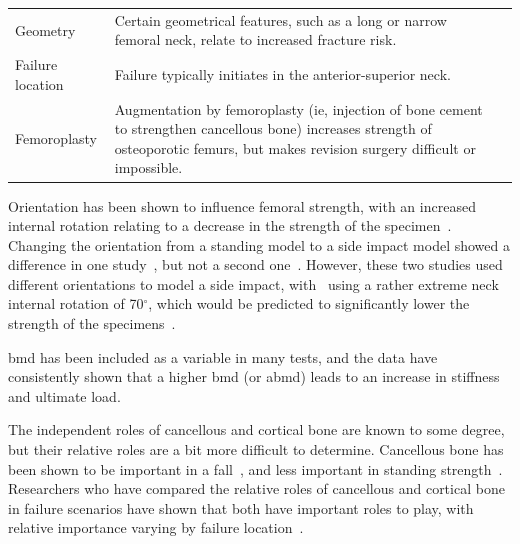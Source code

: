 \begin{table}
\begin{tabularx}{\textwidth}{l X p{4cm}}
Geometry & Certain geometrical features, such as a long or narrow femoral neck, relate to increased fracture risk. & \citep{cheng_assessment_1997} \\

Failure location & Failure typically initiates in the anterior-superior neck. & \citep{de_bakker_hip_2006, de_bakker_during_2009} \\

Femoroplasty & Augmentation by femoroplasty (\ac{ie}, injection of bone cement to strengthen cancellous bone) increases strength of osteoporotic femurs, but makes revision surgery difficult or impossible. & \citep{heini_femoroplasty-augmentation_2004, beckmann_femoroplasty--augmentation_2007, sutter_biomechanical_2010, de_bakker_hip_2006} \\

\bottomrule
\end{tabularx}
\end{table}

\def\arraystretch{1}

Orientation has been shown to influence femoral strength, with an increased internal rotation relating to a decrease in the strength of the specimen~\citep{pinilla_impact_1996, ford_effect_1996}.
Changing the orientation from a standing model to a side impact model showed a difference in one study~\citep{keyak_relationships_2000}, but not a second one~\citep{lochmuller_mechanical_2002}.
However, these two studies used different orientations to model a side impact, with~\citet{keyak_relationships_2000} using a rather extreme neck internal rotation of 70$^\circ$, which would be predicted to significantly lower the strength of the specimens~\citep{pinilla_impact_1996, ford_effect_1996, keyak_effect_2001, ford_effect_1996}.
	
\ac{bmd} has been included as a variable in many tests, and the data have consistently shown that a higher \ac{bmd} (or \ac{abmd}) leads to an increase in stiffness and ultimate load.

The independent roles of cancellous and cortical bone are known to some degree, but their relative roles are a bit more difficult to determine.
Cancellous bone has been shown to be important in a fall~\citep{manske_femoral_2006, manske_cortical_2008, pulkkinen_experimental_2008}, and less important in standing strength~\citep{holzer_hip_2009}.
Researchers who have compared the relative roles of cancellous and cortical bone in failure scenarios have shown that both have important roles to play, with relative importance varying by failure location~\citep{manske_cortical_2008, pulkkinen_experimental_2008}.

